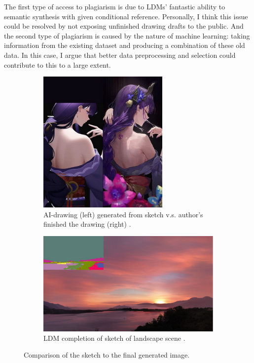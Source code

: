 The first type of access to plagiarism is due to LDMs' fantastic ability to semantic 
synthesis with given conditional reference.
Personally, I think this issue could be resolved by not exposing unfinished drawing drafts to the public.
And the second type of plagiarism is caused by the nature of machine learning:
taking information from the existing dataset and producing a combination of these old data.
In this case, I argue that better data preprocessing and selection could contribute to this to a large extent.
\begin{figure}[h]
     \centering
     \begin{subfigure}[b]{0.49\textwidth}
         \centering
         \includegraphics[width=0.7\textwidth]{img/LDM-2.png}
         \caption{
            AI-drawing (left) generated from sketch v.s. 
            author's finished the drawing (right) \cite{Sahbegovic2022anime}.
        }
     \end{subfigure}
     \hfill
     \begin{subfigure}[b]{0.49\textwidth}
         \centering
         \includegraphics[width=\textwidth]{img/LDM-3.png}
         \caption{LDM completion of sketch of landscape scene \cite{Rombach2022High}.}
     \end{subfigure}
     \hfill
     \caption{Comparison of the sketch to the final generated image.}
\end{figure}
